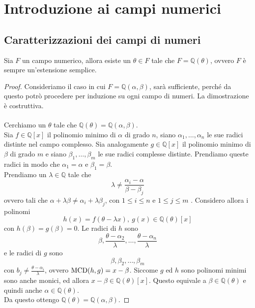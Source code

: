 \section{Introduzione ai campi numerici}
\subsection{Caratterizzazioni dei campi di numeri}
\begin{teorema}
	Sia $F$ un campo numerico, allora esiste un $\theta\in F$ tale che $F=\mathbb{Q}(\theta)$, ovvero $F$ è sempre un'estensione semplice.
\end{teorema}
\begin{proof}
	Consideriamo il caso in cui $F=\mathbb{Q}(\alpha,\beta)$, sarà sufficiente, perché da questo potrò procedere per induzione su ogni campo di numeri. La dimostrazione è costruttiva. \\ \\ 
	Cerchiamo un $\theta$ tale che $\mathbb{Q}(\theta)=\mathbb{Q}(\alpha,\beta)$. \\ Sia $f\in\mathbb{Q}[x]$ il polinomio minimo di $\alpha$ di grado $n$, siano $\alpha_1,\dots,\alpha_n$ le sue radici distinte nel campo complesso. Sia analogamente $g\in\mathbb{Q}[x]$ il polinomio minimo di $\beta$ di grado $m$ e siano $\beta_1,\dots,\beta_m$ le sue radici complesse distinte. Prendiamo queste radici in modo che $\alpha_1=\alpha$ e $\beta_1=\beta$.\\ Prendiamo un $\lambda\in\mathbb{Q}$ tale che 
	\begin{equation*}
	\lambda\neq\frac{\alpha_i-\alpha}{\beta-\beta_j}
	\end{equation*}
	ovvero tali che $\alpha+\lambda\beta\neq\alpha_i+\lambda\beta_j$, con $1\leq i\leq n$ e $1\leq j\leq m$ . Considero allora i polinomi
	\begin{equation*}
	h(x)=f\left(\theta-\lambda x\right), \ g(x)\in\mathbb{Q}(\theta)[x]
	\end{equation*}
	con $h(\beta)=g(\beta)=0$. Le radici di $h$ sono 
	\begin{equation*}
	\beta, \frac{\theta-\alpha_2}{\lambda},\dots,\frac{\theta-\alpha_n}{\lambda}
	\end{equation*}
	e le radici di $g$ sono
	\begin{equation*}
	\beta, \beta_2, \dots, \beta_m
	\end{equation*}
	con $b_j\neq\frac{\theta-\alpha_i}{\lambda}$, ovvero $\operatorname{\mathrm{MCD}}(h,g)=x-\beta$. Siccome $g$ ed $h$ sono polinomi minimi sono anche monici, ed allora $x-\beta\in\mathbb{Q}(\theta)[x]$. Questo equivale a $\beta\in\mathbb{Q}(\theta)$ e quindi anche $\alpha\in\mathbb{Q}(\theta)$.\\ Da questo ottengo $\mathbb{Q}(\theta) = \mathbb{Q}(\alpha,\beta)$.
\end{proof}
